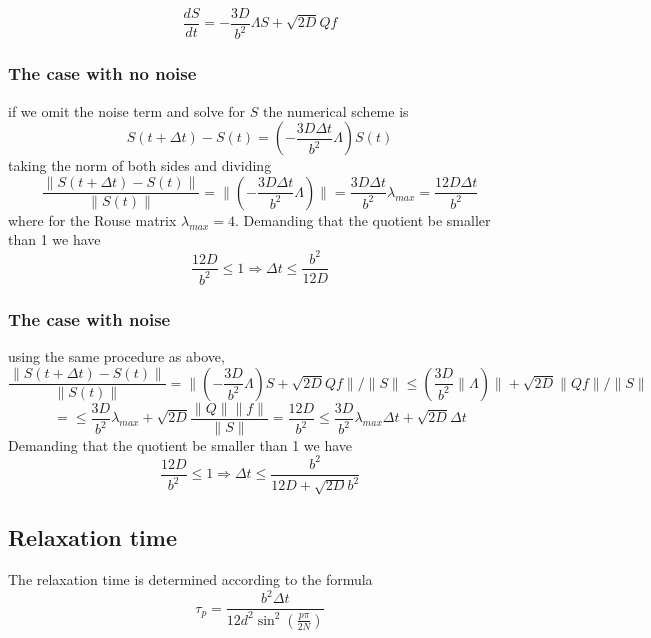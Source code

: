 \documentclass{report}
\begin{document}
\begin{equation*}
\frac{dS}{dt}=-\frac{3D}{b^2}\Lambda S+\sqrt{2D}Qf
\end{equation*}
\subsubsection{The case with no noise}
if we omit the noise term and solve for $S$ 
the numerical scheme is 
\begin{equation*}
S(t+\Delta t)-S(t)=(-\frac{3D\Delta t}{b^2}\Lambda)S(t)
\end{equation*}
taking the norm of both sides and dividing 
\begin{equation*}
\frac{\|S(t+\Delta t)-S(t)\|}{\|S(t)\|}=\|(-\frac{3D\Delta t}{b^2}\Lambda)\| = \frac{3D\Delta t}{b^2}\lambda_{max}= \frac{12D\Delta t}{b^2}
\end{equation*}
where for the Rouse matrix $\lambda_{max} = 4$.  Demanding that the quotient be smaller than 1 we have 
\begin{equation*}
 \frac{12D}{b^2}\leq1 \Longrightarrow \Delta t \leq \frac{b^2}{12D}
 \end{equation*}
 \subsubsection{The case with noise}
 using the same procedure as above, 
 \begin{equation*}
\frac{\|S(t+\Delta t)-S(t)\|}{\|S(t)\|}=\|(-\frac{3D}{b^2}\Lambda)S+\sqrt{2D}Qf\|/\|S\|\leq(\frac{3D}{b^2}\|\Lambda)\| +\sqrt{2D}\|Qf\|/\|S\|
 \end{equation*}
 \begin{equation*}
 =\leq \frac{3D}{b^2}\lambda_{max} +\sqrt{2D}\frac{\|Q\|\|f\|}{\|S\|}=\frac{12D}{b^2}\leq\frac{3D}{b^2}\lambda_{max}\Delta t +\sqrt{2D}\Delta t
 \end{equation*}
Demanding that the quotient be smaller than 1 we have 
\begin{equation*}
 \frac{12D}{b^2}\leq1 \Longrightarrow \Delta t \leq \frac{b^2}{12D+\sqrt{2D}b^2}
 \end{equation*}
\subsection{Relaxation time}
The relaxation time is determined according to the formula
\begin{equation}
\tau_p = \frac{b^2\Delta t}{12d^2\sin^2(\frac{p\pi}{2N})}
\end{equation} 
\end{document}
